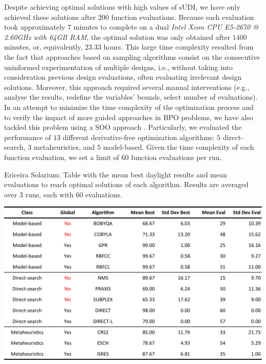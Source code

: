 Despite achieving optimal solutions with high values of \ac{sUDI}, we have only achieved these solutions after $200$ function evaluations. Because each evaluation took approximately $7$ minutes to complete on a dual \textit{Intel Xeon CPU E5-2670 @ 2.60GHz with 64GB RAM}, the optimal solution was only obtained after $1400$ minutes, or, equivalently, $23.33$ hours. This large time complexity resulted from the fact that approaches based on sampling algorithms consist on the consecutive uninformed experimentation of multiple designs, i.e., without taking into consideration previous design evaluations, often evaluating irrelevant design solutions. Moreover, this approach required several manual interventions (e.g., analyse the results, redefine the variables' bounds, select number of evaluations). In an attempt to minimize the time complexity of the optimization process and to verify the impact of more guided approaches in \ac{BPO} problems, we have also tackled this problem using a \ac{SOO} approach \cite{Belem2018optimizeddesign}. Particularly, we evaluated the performance of $13$ different derivative-free optimization algorithms: $5$ direct-search, $3$ metaheuristics, and $5$ model-based. Given the time complexity of each function evaluation, we set a limit of $60$ function evaluations per run.

\begin{table}[htbp]
	\centering
	\caption[Ericeira Solarium: Mean best results and evaluations discriminated per algorithm]{Ericeira Solarium: Table with the mean best daylight results and mean evaluations to reach optimal solutions of each algorithm. Results are averaged over $3$ runs, each with $60$ evaluations.}
	\label{table:phase1results}
	\includegraphics[width=\textwidth]{tables_and_code/Ericeira_phase1_stats_v1.pdf}
\end{table}

